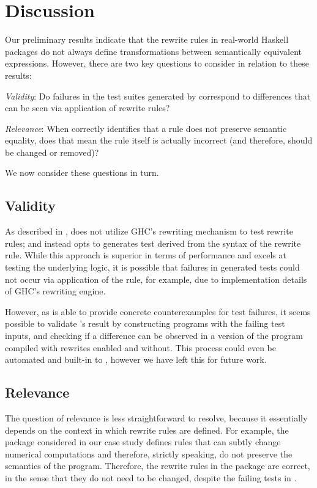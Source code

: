 \section{Discussion}\label{sec:discussion}

Our preliminary results indicate that the rewrite rules in real-world Haskell
packages do not always define transformations between semantically equivalent
expressions. However, there are two key questions to consider in relation to these
results:
\smallskip

\textit{Validity}: Do failures in the test suites generated by \Rulecheck
correspond to differences that can be seen via application of rewrite rules?
\smallskip

\textit{Relevance}: When \Rulecheck correctly identifies that a rule does not
preserve semantic equality, does that mean the rule itself is actually incorrect
(and therefore, should be changed or removed)?
\smallskip

We now consider these questions in turn.

\subsection{Validity}

As described in , \Rulecheck does not utilize GHC's
rewriting mechanism to test rewrite rules; and instead opts to generates test
derived from the syntax of the rewrite rule. While this approach is superior in
terms of performance and excels at testing the underlying logic, it is possible
that failures in \Rulecheck generated tests could not occur via application of
the rule, for example, due to implementation details of GHC's rewriting engine.

However, as \Rulecheck is able to provide concrete counterexamples for test
failures, it seems possible to validate \Rulecheck's result by constructing
programs with the failing test inputs, and checking if a difference can be
observed in a version of the program compiled with rewrites enabled and without.
This process could even be automated and built-in to \Rulecheck, however we have
left this for future work. 

\subsection{Relevance}

The question of relevance is less straightforward to resolve, because it
essentially depends on the context in which rewrite rules are defined. For
example, the \fastmath package considered in our case study defines rules that
can subtly change numerical computations and therefore, strictly speaking, do
not preserve the semantics of the program. Therefore, the rewrite rules in the
package are correct, in the sense that they do not need to be changed, despite
the failing tests in \Rulecheck.

